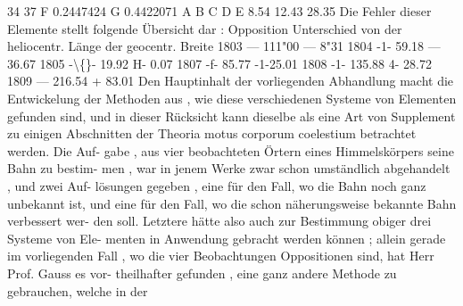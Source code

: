 \documentclass[12pt,a4paper]{article}
\begin{document}
34     37
F    0.2447424
G    0.4422071
A
B
C
D
E
8.54
12.43
28.35
Die  Fehler  dieser  Elemente  stellt  folgende  Übersicht  dar :
Opposition
Unterschied
von
der  heliocentr.  Länge
der geocentr.  Breite
1803
---  111"00
---    8"31
1804
-1-     59.18
---  36.67
1805
-\textbackslash\{\}-     19.92
H-    0.07
1807
-f-     85.77
-1-25.01
1808
-1-  135.88
4-  28.72
1809
---  216.54
+  83.01
Den  Hauptinhalt  der  vorliegenden  Abhandlung  macht  die  Entwickelung  der
Methoden  aus ,  wie  diese  verschiedenen  Systeme  von  Elementen  gefunden  sind,
und  in  dieser  Rücksicht  kann  dieselbe  als  eine  Art  von  Supplement  zu  einigen
Abschnitten  der  Theoria  motus  corporum  coelestium  betrachtet  werden.  Die  Auf-
gabe ,  aus  vier  beobachteten  Örtern  eines  Himmelskörpers  seine  Bahn  zu  bestim-
men ,  war  in  jenem  Werke  zwar  schon  umständlich  abgehandelt ,  und  zwei  Auf-
lösungen gegeben ,  eine  für  den  Fall,  wo  die  Bahn  noch  ganz  unbekannt  ist,  und
eine  für  den  Fall,  wo  die  schon  näherungsweise  bekannte  Bahn  verbessert  wer-
den soll.  Letztere  hätte  also  auch  zur  Bestimmung  obiger  drei  Systeme  von  Ele-
menten in  Anwendung  gebracht  werden  können ;  allein  gerade  im  vorliegenden
Fall ,  wo  die  vier  Beobachtungen  Oppositionen  sind,  hat  Herr  Prof.  Gauss  es  vor-
theilhafter  gefunden ,  eine  ganz  andere  Methode  zu  gebrauchen,  welche  in  der

\newpage
\end{document}

